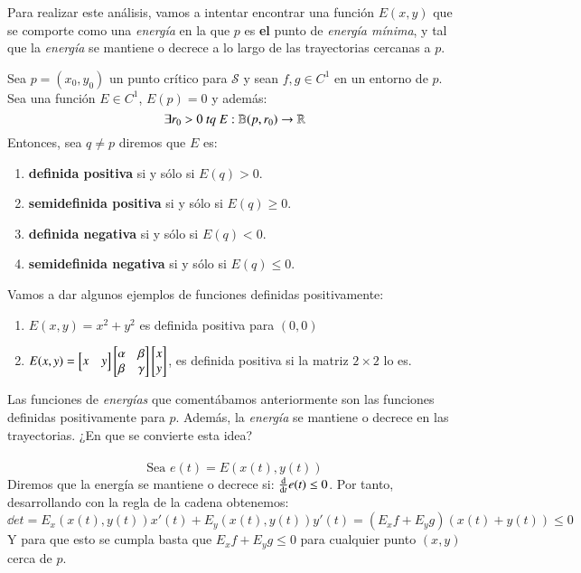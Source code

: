 Para realizar este análisis, vamos a intentar encontrar una función $E(x, y)$ que se comporte como una \textit{energía} en la que $p$ es \textbf{el} punto de \textit{energía mínima}, y tal que la \textit{energía} se mantiene o decrece a lo largo de las trayectorias cercanas a $p$.
\begin{dfn}
    Sea $p = (x_0, y_0)$ un punto crítico para $\mathcal{S}$ y sean $f, g \in C^1$ en un entorno de $p$.\\
    Sea una función $E \in C^1$, $E(p) = 0$ y además:
    $$
        \exists r_0 > 0\ tq\ E: \mathbb{B}(p, r_0) \to \mathbb{R}
    $$
    Entonces, sea $q \neq p$ diremos que $E$ es:
    \begin{enumerate}
        \item \textbf{definida positiva} si y sólo si $E(q) > 0$.
        \item \textbf{semidefinida positiva} si y sólo si $E(q) \geq 0$.
        \item \textbf{definida negativa} si y sólo si $E(q) < 0$.
        \item \textbf{semidefinida negativa} si y sólo si $E(q) \leq 0$.
    \end{enumerate}
\end{dfn}
\begin{obs}
    Vamos a dar algunos ejemplos de funciones definidas positivamente:
    \begin{enumerate}
        \item $E(x, y) = x^2 + y^2$ es definida positiva para $(0,0)$
        \item $E(x, y) = \mx{x & y} \mx{\alpha & \beta \\ \beta & \gamma} \mx{x \\ y}$, es definida positiva si la matriz $2 \times 2$ lo es.
    \end{enumerate}
\end{obs}
Las funciones de \textit{energías} que comentábamos anteriormente son las funciones definidas positivamente para $p$. Además, la \textit{energía} se mantiene o decrece en las trayectorias. ¿En que se convierte esta idea?\\\\
$$
    \text{Sea } e(t) = E(x(t), y(t))
$$
Diremos que la energía se mantiene o decrece si: $\frac{\mathrm{d}}{\mathrm{d}t} e(t) \leq 0$. Por tanto, desarrollando con la regla de la cadena obtenemos:
$$
    \dd{e}{t} = E_x(x(t), y(t)) x'(t) + E_y(x(t), y(t)) y'(t) = (E_x f + E_y g) (x(t) + y(t)) \leq 0
$$
Y para que esto se cumpla basta que $E_x f + E_y g \leq 0$ para cualquier punto $(x, y)$ cerca de $p$.

